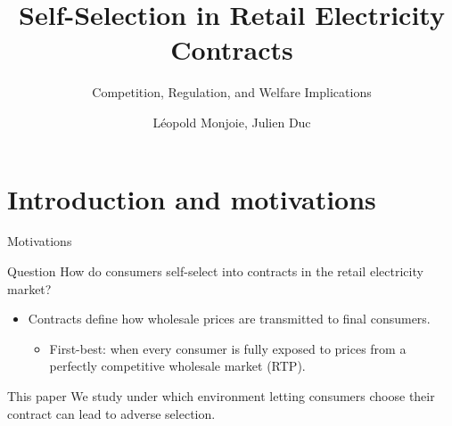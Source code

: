 \documentclass{class}
\title{Self-Selection in Retail Electricity Contracts}
\subtitle{Competition, Regulation, and Welfare Implications}
\author{Léopold Monjoie, Julien Duc}
\institute{Aalto University \and Université Paris Dauphine, PSL Research University, LEDa}
\begin{document}
\newlength{\tempb}

\frame{\titlepage}

\newcommand{\commentedbox}[2]{%
  \mbox{
    \begin{tabular}[t]{@{}c@{}}
    $\boxed{\displaystyle#1}$\\
    #2
    \end{tabular}%
  }%
}

\newcommand\Wider[2][3em]{%
\makebox[\linewidth][c]{%
  \begin{minipage}{\dimexpr\textwidth+#1\relax}
  \raggedright#2
  \end{minipage}%
  }%
}

\newcommand*\circled[1]{\tikz[baseline=(char.base)]{
            \node[shape=circle,draw,inner sep=2pt] (char) {#1};}}



\section{Introduction and motivations}


\begin{frame}{Motivations}\label{Motivations}

\begin{mainbox}{Question}
How do consumers self-select into contracts in the retail electricity market?
\end{mainbox}

\vfill

\begin{itemize}
    \item Contracts define how wholesale prices are transmitted to final consumers. \vfill
\begin{itemize}
    \item First-best: when every consumer is fully exposed to prices from a perfectly competitive wholesale market (RTP). \vfill
\end{itemize}

\end{itemize}

\begin{mainbox}{This paper}
We study under which environment letting consumers choose their contract can lead to adverse selection.
\end{mainbox}
       
\end{frame}
\end{document}
